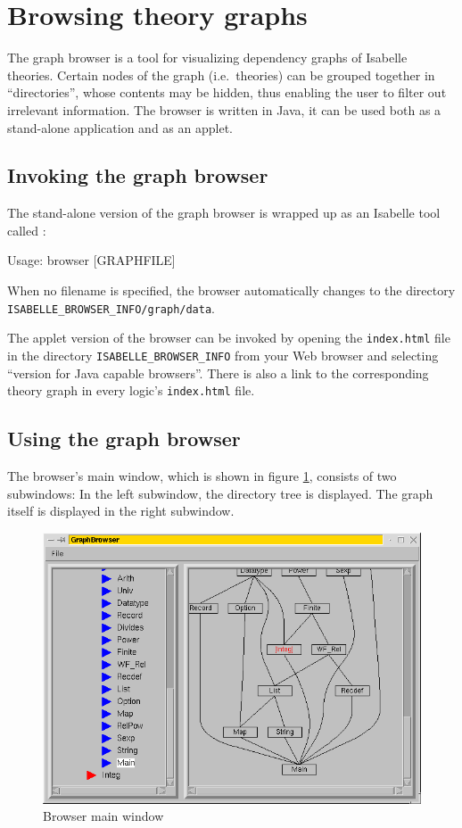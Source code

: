 \section{Browsing theory graphs} \label{sec:browse}

The graph browser is a tool for visualizing dependency graphs of
Isabelle theories. Certain nodes of the graph (i.e.~theories) can be
grouped together in ``directories'', whose contents may be hidden,
thus enabling the user to filter out irrelevant information.  The
browser is written in Java, it can be used both as a stand-alone
application and as an applet.


\subsection{Invoking the graph browser}

The stand-alone version of the graph browser is wrapped up as an
Isabelle tool called :
\begin{ttbox}
Usage: browser [GRAPHFILE]
\end{ttbox}
When no filename is specified, the browser automatically changes to
the directory \texttt{ISABELLE_BROWSER_INFO/graph/data}.

\medskip The applet version of the browser can be invoked by opening
the {\tt index.html} file in the directory
\texttt{ISABELLE_BROWSER_INFO} from your Web browser and selecting
``version for Java capable browsers''.  There is also a link to the
corresponding theory graph in every logic's {\tt index.html} file.


\subsection{Using the graph browser}

The browser's main window, which is shown in figure
\ref{browserwindow}, consists of two subwindows: In the left
subwindow, the directory tree is displayed. The graph itself is
displayed in the right subwindow.
\begin{figure}[h]
  \includegraphics[width=\textwidth]{browser_screenshot}
  \caption{\label{browserwindow} Browser main window}
\end{figure}


